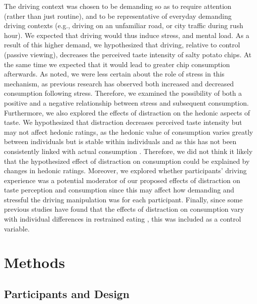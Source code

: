 \documentclass[authordate, empirical, issue]{jote-new-article}
\begin{document}
The driving context was chosen to be demanding so as to require attention (rather than just routine), and to be representative of everyday demanding driving contexts (e.g., driving on an unfamiliar road, or city traffic during rush hour). We expected that driving would thus induce stress, and mental load. As a result of this higher demand, we hypothesized that driving, relative to control (passive viewing), decreases the perceived taste intensity of salty potato chips. At the same time we expected that it would lead to greater chip consumption afterwards. As noted, we were less certain about the role of stress in this mechanism, as previous research has observed both increased and decreased consumption following stress. Therefore, we examined the possibility of both a positive and a negative relationship between stress and subsequent consumption. Furthermore, we also explored the effects of distraction on the hedonic aspects of taste. We hypothesized that distraction decreases perceived taste intensity but may not affect hedonic ratings, as the hedonic value of consumption varies greatly between individuals but is stable within individuals and as this has not been consistently linked with actual consumption \parencites{DiFeliceantonio2018}{McCrickerd2016}{Tang2014}. Therefore, we did not think it likely that the hypothesized effect of distraction on consumption could be explained by changes in hedonic ratings. Moreover, we explored whether participants’ driving experience was a potential moderator of our proposed effects of distraction on taste perception and consumption since this may affect how demanding and stressful the driving manipulation was for each participant. Finally, since some previous studies have found that the effects of distraction on consumption vary with individual differences in restrained eating \parencites{Boon2002}{Ogden2013}, this was included as a control variable.







\section{Methods}



\subsection{Participants and Design}
\end{document}
